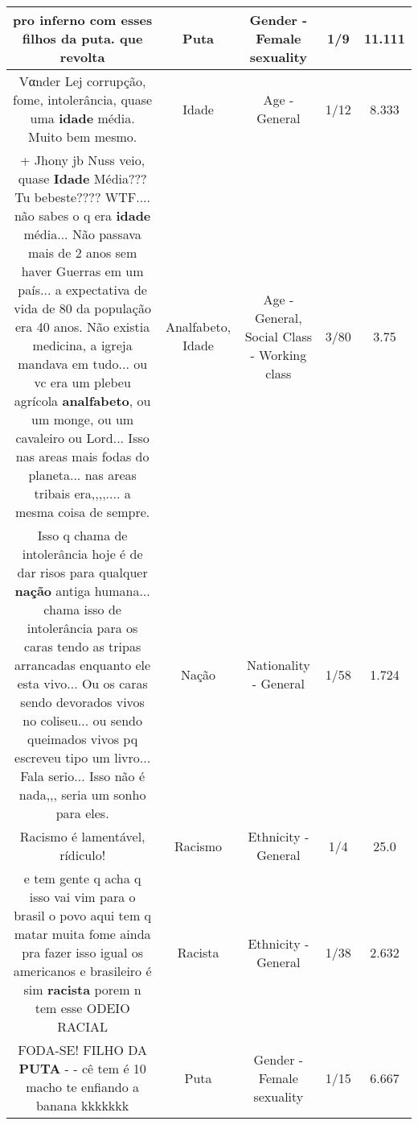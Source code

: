 \documentclass[11pt]{article}
\newlength\mylength
\begin{document}
\begin{center}
\begin{longtable}{|C{.65\mylength}|C{.30\mylength}|C{.12\mylength}|C{.12\mylength}|C{.12\mylength}|}
  \small pro inferno com esses filhos da \textbf{puta}. que revolta\normalsize   & Puta & Gender - Female sexuality & 1/9 & 11.111 \\  \hline
  \small Vαnder Lej corrupção, fome, intolerância, quase uma \textbf{idade} média. Muito bem mesmo.\normalsize   & Idade & Age - General & 1/12 & 8.333 \\  \hline
  \small + Jhony jb Nuss veio, quase \textbf{Idade} Média??? Tu bebeste???? WTF.... não sabes o q era \textbf{idade} média... Não passava mais de 2 anos sem haver Guerras em um país... a expectativa de vida de 80 da população era 40 anos. Não existia medicina, a igreja mandava em tudo... ou vc era um plebeu agrícola \textbf{analfabeto}, ou um monge, ou um cavaleiro ou Lord... Isso nas areas mais fodas do planeta... nas areas tribais era,,,,.... a mesma coisa de sempre.\normalsize   & Analfabeto, Idade & Age - General, Social Class - Working class & 3/80 & 3.75 \\  \hline
  \small Isso q chama de intolerância hoje é de dar risos para qualquer \textbf{nação} antiga humana... chama isso de intolerância para os caras tendo as tripas arrancadas enquanto ele esta vivo...  Ou os caras sendo devorados vivos no coliseu... ou sendo queimados vivos pq escreveu tipo um livro... Fala serio... Isso não é nada,,, seria um sonho para eles.\normalsize   & Nação & Nationality - General & 1/58 & 1.724 \\  \hline
  \small Racismo é  lamentável, rídiculo!\normalsize   & Racismo & Ethnicity - General & 1/4 & 25.0 \\  \hline
  \small e tem gente q acha q isso vai vim para o brasil o povo aqui tem q matar muita fome ainda pra fazer isso igual os americanos e brasileiro é sim \textbf{racista} porem n tem esse ODEIO RACIAL\normalsize   & Racista & Ethnicity - General & 1/38 & 2.632 \\  \hline
  \small FODA-SE! FILHO DA \textbf{PUTA} - - cê tem é 10 macho te enfiando a banana kkkkkkk\normalsize   & Puta & Gender - Female sexuality & 1/15 & 6.667 \\  \hline

\end{longtable}
\end{center}
\end{document}
